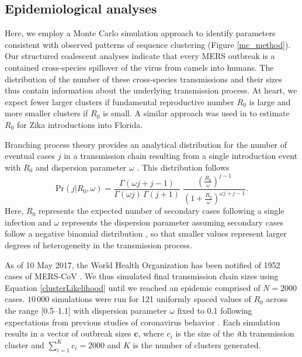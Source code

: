 \documentclass[11pt,oneside,letterpaper]{article}
\begin{document}
\subsection*{Epidemiological analyses}

Here, we employ a Monte Carlo simulation approach to identify parameters consistent with observed patterns of sequence clustering (Figure \ref{mc_method}).
Our structured coalescent analyses indicate that every MERS outbreak is a contained cross-species spillover of the virus from camels into humans.
The distribution of the number of these cross-species transmissions and their sizes thus contain information about the underlying transmission process.
At heart, we expect fewer larger clusters if fundamental reproductive number $R_0$ is large and more smaller clusters if $R_0$ is small.
A similar approach was used in \citet{grubaugh_multiple_2017} to estimate $R_0$ for Zika introductions into Florida.

Branching process theory provides an analytical distribution for the number of eventual cases $j$ in a transmission chain resulting from a single introduction event with $R_0$ and dispersion parameter $\omega$ \citep{blumberg_inference_2013}.
This distribution follows
\begin{equation}
\mathrm{Pr}(j | R_{0}, \omega) = \frac{\Gamma(\omega j+j-1)}{\Gamma(\omega j) \, \Gamma(j+1)} \; \frac{(\frac{R_{0}}{\omega})^{j-1}}{(1+\frac{R_{0}}{\omega})^{\omega j+j-1}}.
\label{clusterLikelihood}
\end{equation}
Here, $R_0$ represents the expected number of secondary cases following a single infection and $\omega$ represents the dispersion parameter assuming secondary cases follow a negative binomial distribution \citep{lloyd-smith_superspreading_2005}, so that smaller values represent larger degrees of heterogeneity in the transmission process.

As of 10 May 2017, the World Health Organization has been notified of 1952 cases of MERS-CoV \citep{who_mers_summary_2017}.
We thus simulated final transmission chain sizes using Equation \ref{clusterLikelihood} until we reached an epidemic comprised of $N=2000$ cases.
$10\,000$ simulations were run for 121 uniformly spaced values of $R_0$ across the range [0.5--1.1] with dispersion parameter $\omega$ fixed to 0.1 following expectations from previous studies of coronavirus behavior \citep{lloyd-smith_superspreading_2005}.
Each simulation results in a vector of outbreak sizes $\mathbf{c}$, where $c_i$ is the size of the \textit{i}th transmission cluster and $\sum_{i=1}^{K} c_i = 2000$ and $K$ is the number of clusters generated.
\end{document}
